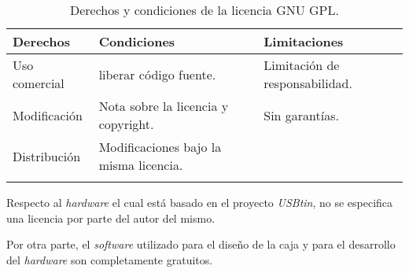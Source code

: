 \begin{longtable}[]{@{}lll@{}}
\toprule
\begin{minipage}[b]{0.20\columnwidth}\raggedright\strut
Derechos\strut
\end{minipage} & \begin{minipage}[b]{0.33\columnwidth}\raggedright\strut
Condiciones\strut
\end{minipage} & \begin{minipage}[b]{0.33\columnwidth}\raggedright\strut
Limitaciones\strut
\end{minipage}\tabularnewline
\midrule
\endhead
\begin{minipage}[t]{0.20\columnwidth}\raggedright\strut
Uso comercial\strut
\end{minipage} & \begin{minipage}[t]{0.33\columnwidth}\raggedright\strut
liberar código fuente.\strut
\end{minipage} & \begin{minipage}[t]{0.33\columnwidth}\raggedright\strut
Limitación de responsabilidad.\strut
\end{minipage}\tabularnewline
\begin{minipage}[t]{0.20\columnwidth}\raggedright\strut
Modificación\strut
\end{minipage} & \begin{minipage}[t]{0.33\columnwidth}\raggedright\strut
Nota sobre la licencia y copyright.\strut
\end{minipage} & \begin{minipage}[t]{0.33\columnwidth}\raggedright\strut
Sin garantías.\strut
\end{minipage}\tabularnewline
\begin{minipage}[t]{0.20\columnwidth}\raggedright\strut
Distribución\strut
\end{minipage} & \begin{minipage}[t]{0.33\columnwidth}\raggedright\strut
Modificaciones bajo la misma licencia.\strut
\end{minipage} & \begin{minipage}[t]{0.33\columnwidth}\raggedright\strut
\strut
\end{minipage}\tabularnewline
\bottomrule
\caption{Derechos y condiciones de la licencia GNU GPL.}
\end{longtable}


Respecto al \emph{hardware} el cual está basado en el proyecto \emph{USBtin}\cite{usbtin:scheme}, no se especifica una licencia por parte del autor del mismo.

Por otra parte, el \emph{software} utilizado para el diseño de la caja y para el desarrollo del \emph{hardware} son completamente gratuitos.
